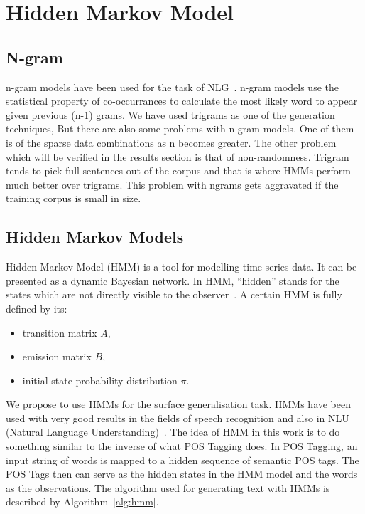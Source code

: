 \documentclass[a4paper,12pt]{article}
\begin{document}
\section{Hidden Markov Model}
\label{sec:method}

\subsection{N-gram}
n-gram models have been used for the task of NLG~\cite{nlgngram}. n-gram models use the
statistical property of co-occurrances to calculate the most likely word to
appear given previous (n-1) grams. We have used trigrams as one of the generation techniques,
But there are  also some problems with n-gram models. One of them 
is of the sparse data combinations as n becomes greater. The other problem which will be 
verified in the results section is that of non-randomness. Trigram tends to 
pick full sentences out of the corpus and that is where HMMs perform much
better over trigrams. This problem with ngrams gets aggravated if the training
corpus is small in size. 


\subsection{Hidden Markov Models}
Hidden Markov Model (HMM) is a tool for modelling time series data.
It can be presented as a dynamic Bayesian network. In HMM, ``hidden''
stands for the states which are not directly visible to the observer~\cite{hmm}.
A certain HMM is fully defined by its:
\begin{itemize}
  \item transition matrix $A$,
  \item emission matrix $B$,
  \item initial state probability distribution $\pi$.
\end{itemize}

We propose to use HMMs for the surface generalisation task. HMMs have been used
with very good results in the fields of speech recognition and also in NLU
(Natural Language Understanding)~\cite{hmmsr}. The idea of HMM in this work is
to do something similar to the inverse of what POS Tagging does. In POS
Tagging, an input string of words is mapped to a hidden sequence of semantic POS
tags. The POS Tags then can serve as the hidden states in the HMM model and the
words as the observations. The algorithm used for generating text with HMMs is
described by Algorithm~\ref{alg:hmm}.
\end{document}
